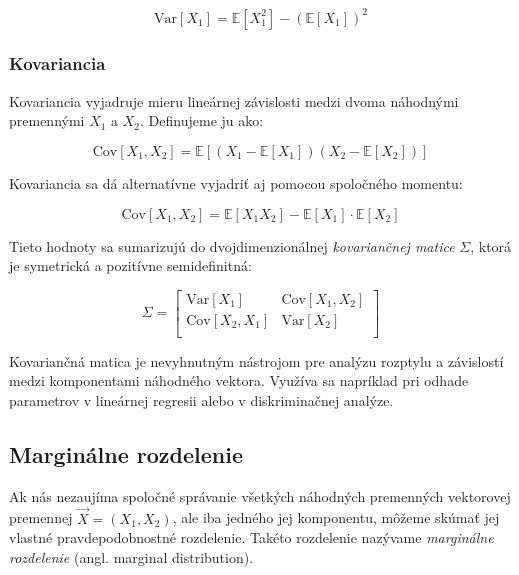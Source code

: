\begin{equation}
\mathrm{Var}[X_1] = \mathbb{E}[X_1^2] - (\mathbb{E}[X_1])^2
\end{equation}

\subsubsection{Kovariancia}\label{subsubsec:joint_covariance}

Kovariancia vyjadruje mieru lineárnej závislosti medzi dvoma náhodnými premennými \(X_1\) a \(X_2\). Definujeme ju ako:

\begin{equation}
\mathrm{Cov}[X_1, X_2] = \mathbb{E}[(X_1 - \mathbb{E}[X_1])(X_2 - \mathbb{E}[X_2])]
\end{equation}

Kovariancia sa dá alternatívne vyjadriť aj pomocou spoločného momentu:

\begin{equation}
\mathrm{Cov}[X_1, X_2] = \mathbb{E}[X_1 X_2] - \mathbb{E}[X_1] \cdot \mathbb{E}[X_2]
\end{equation}

Tieto hodnoty sa sumarizujú do dvojdimenzionálnej \textit{kovariančnej matice} \(\Sigma\), ktorá je symetrická a pozitívne semidefinitná:

\begin{equation}
\Sigma = 
\begin{bmatrix}
\mathrm{Var}[X_1] & \mathrm{Cov}[X_1, X_2] \\
\mathrm{Cov}[X_2, X_1] & \mathrm{Var}[X_2] \\
\end{bmatrix}
\end{equation}

Kovariančná matica je nevyhnutným nástrojom pre analýzu rozptylu a závislostí medzi komponentami náhodného vektora. Využíva sa napríklad pri odhade parametrov v lineárnej regresii alebo v diskriminačnej analýze.

\subsection{Marginálne rozdelenie}\label{subsec:marginal_dist}

Ak nás nezaujíma spoločné správanie všetkých náhodných premenných vektorovej premennej $\vec{X} = (X_1, X_2)$, ale iba jedného jej komponentu, môžeme skúmať jej vlastné pravdepodobnostné rozdelenie. Takéto rozdelenie nazývame \textit{marginálne rozdelenie} (angl. marginal distribution).

